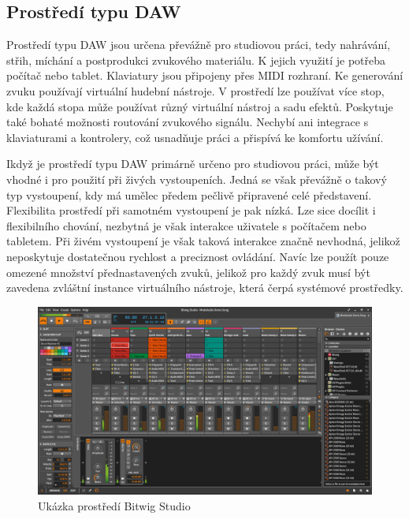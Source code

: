 \documentclass[thesis=M,czech]{FITthesis}[2019/03/06]
\begin{document}
	\subsection{Prostředí typu DAW}
	Prostředí typu DAW jsou určena převážně pro studiovou práci, tedy nahrávání, střih, míchání a postprodukci zvukového materiálu.
	K jejich využití je potřeba počítač nebo tablet. Klaviatury jsou připojeny přes MIDI rozhraní. Ke generování zvuku používají virtuální hudební nástroje.
	V prostředí lze používat více stop, kde každá stopa může používat různý virtuální nástroj a sadu efektů.
	Poskytuje také bohaté možnosti routování zvukového signálu.
	Nechybí ani integrace s klaviaturami a kontrolery, což usnadňuje práci a přispívá ke komfortu užívání.
	
	Ikdyž je prostředí typu DAW primárně určeno pro studiovou práci, může být vhodné i pro použití při živých vystoupeních.
	Jedná se však převážně o takový typ vystoupení, kdy má umělec předem pečlivě připravené celé představení.
	Flexibilita prostředí při samotném vystoupení je pak nízká.
	Lze sice docílit i flexibilního chování, nezbytná je však interakce uživatele s počítačem nebo tabletem. Při živém vystoupení
	je však taková interakce značně nevhodná, jelikož neposkytuje dostatečnou rychlost a preciznost ovládání.
	Navíc lze použít pouze omezené množství přednastavených zvuků, jelikož pro každý zvuk musí být zavedena zvláštní instance
	virtuálního nástroje, která čerpá systémové prostředky.
	
	\begin{figure}[H]
		\centering
		\includegraphics[width=1\textwidth]{DAW}
		\caption{Ukázka prostředí Bitwig Studio}\label{fig:DAW}
	\end{figure}
	
	\clearpage
\end{document}
